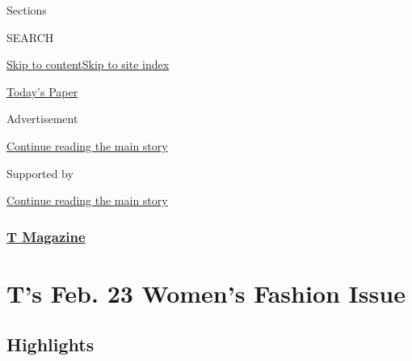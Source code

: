 Sections

SEARCH

\protect\hyperlink{site-content}{Skip to
content}\protect\hyperlink{site-index}{Skip to site index}

\href{https://myaccount.nytimes3xbfgragh.onion/auth/login?response_type=cookie\&client_id=vi}{}

\href{https://www.nytimes3xbfgragh.onion/section/todayspaper}{Today's
Paper}

Advertisement

\protect\hyperlink{after-top}{Continue reading the main story}

Supported by

\protect\hyperlink{after-sponsor}{Continue reading the main story}

\hypertarget{t-magazine}{%
\subsubsection{\texorpdfstring{\href{/section/t-magazine}{T
Magazine}}{T Magazine}}\label{t-magazine}}

\hypertarget{ts-feb-23-womens-fashion-issue}{%
\section{T's Feb. 23 Women's Fashion
Issue}\label{ts-feb-23-womens-fashion-issue}}

\hypertarget{highlights}{%
\subsection{Highlights}\label{highlights}}

